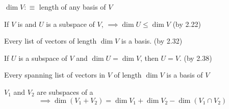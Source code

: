 \begin{mydef} $\dim V :\equiv$ length of any basis of $V$
\end{mydef}

\setcounter{thm}{36}
\begin{thm} If $V$ is \fd  and $U$ is a subspace of $V$, $\implies \dim U \leq \dim V$ (by 2.22)
\end{thm}

\begin{thm} Every \lid list of vectors of length $\dim V$ is a basis. (by 2.32)   
\end{thm}

\begin{thm} If $U$ is a subspace of $V$ and $\dim U = \dim V$, then $U=V$. (by 2.38)
\end{thm}

\setcounter{thm}{41}
\begin{thm}
Every spanning list of vectors in $V$ of length $\dim V$ is a basis of $V$
\end{thm}

\begin{thm} $V_1$ and $V_2$ are subspaces of a \fdvs
\begin{equation}
	\implies \dim (V_1 + V_2) = \dim V_1 + \dim V_2 - \dim (V_1 \cap V_2)
\end{equation}
\end{thm}